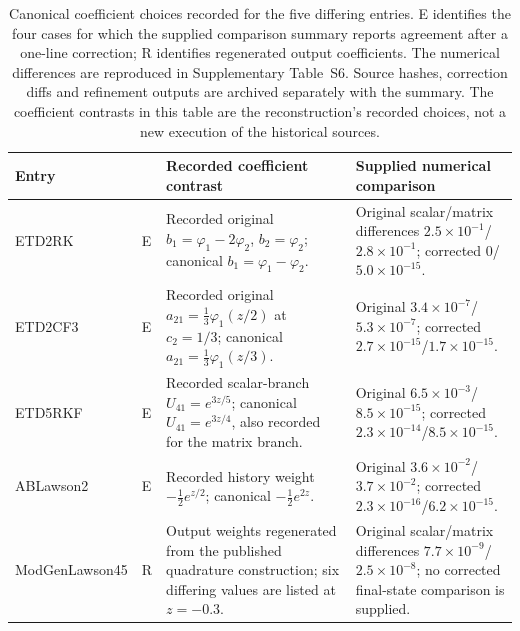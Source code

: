 \begin{table}[t]
\centering\small
\caption{Canonical coefficient choices recorded for the five differing entries.
E identifies the four cases for which the supplied comparison summary reports
agreement after a one-line correction; R identifies regenerated output
coefficients.  The numerical differences are reproduced in Supplementary
Table~S6.  Source hashes, correction diffs and refinement outputs are archived
separately with the summary.  The coefficient contrasts in this table are
the reconstruction's recorded choices, not a new execution of the historical sources.}\label{tab:reconciliation}
\begin{tabularx}{\linewidth}{@{}p{2.50cm}p{.25cm}X X@{}}\toprule
Entry & & Recorded coefficient contrast & Supplied numerical comparison\\\midrule
ETD2RK & E & Recorded original $b_1=\varphi_1-2\varphi_2$, $b_2=\varphi_2$; canonical $b_1=\varphi_1-\varphi_2$. & Original scalar/matrix differences $2.5\times10^{-1}$/$2.8\times10^{-1}$; corrected $0$/$5.0\times10^{-15}$.\\\addlinespace
ETD2CF3 & E & Recorded original $a_{21}=\tfrac13\varphi_1(z/2)$ at $c_2=1/3$; canonical $a_{21}=\tfrac13\varphi_1(z/3)$. & Original $3.4\times10^{-7}$/$5.3\times10^{-7}$; corrected $2.7\times10^{-15}$/$1.7\times10^{-15}$.\\\addlinespace
ETD5RKF & E & Recorded scalar-branch $U_{41}=e^{3z/5}$; canonical $U_{41}=e^{3z/4}$, also recorded for the matrix branch. & Original $6.5\times10^{-3}$/$8.5\times10^{-15}$; corrected $2.3\times10^{-14}$/$8.5\times10^{-15}$.\\\addlinespace
ABLawson2 & E & Recorded history weight $-\tfrac12e^{z/2}$; canonical $-\tfrac12e^{2z}$. & Original $3.6\times10^{-2}$/$3.7\times10^{-2}$; corrected $2.3\times10^{-16}$/$6.2\times10^{-15}$.\\\addlinespace
ModGenLawson45 & R & Output weights regenerated from the published quadrature construction; six differing values are listed at $z=-0.3$. & Original scalar/matrix differences $7.7\times10^{-9}$/$2.5\times10^{-8}$; no corrected final-state comparison is supplied.\\
\bottomrule
\end{tabularx}
\end{table}


